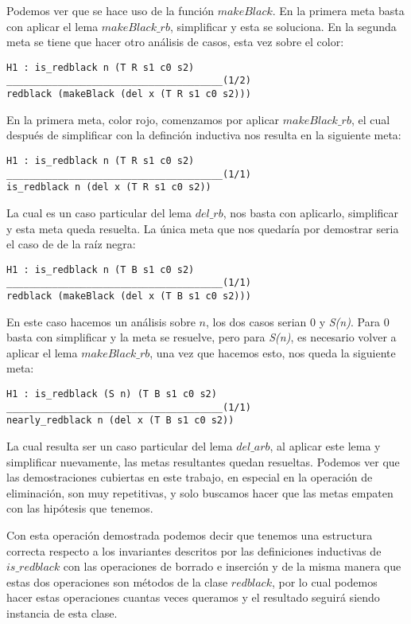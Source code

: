 Podemos ver que se hace uso de la funci\'on $makeBlack$. En la primera meta basta con aplicar el
lema $makeBlack\_rb$, simplificar y esta se soluciona. En la segunda meta se tiene que hacer otro
an\'alisis de casos, esta vez sobre el color:

\begin{verbatim}
H1 : is_redblack n (T R s1 c0 s2)
______________________________________(1/2)
redblack (makeBlack (del x (T R s1 c0 s2)))

\end{verbatim}

En la primera meta, color rojo, comenzamos por aplicar $makeBlack\_rb$, el cual despu\'es de
simplificar con la definci\'on inductiva nos resulta en la siguiente meta:

\begin{verbatim}
H1 : is_redblack n (T R s1 c0 s2)
______________________________________(1/1)
is_redblack n (del x (T R s1 c0 s2))
\end{verbatim}

La cual es un caso particular del lema $del\_rb$, nos basta con aplicarlo, simplificar y esta meta
queda resuelta. La \'unica meta que nos quedaría por demostrar seria el caso de de la raíz negra:

\begin{verbatim}
H1 : is_redblack n (T B s1 c0 s2)
______________________________________(1/1)
redblack (makeBlack (del x (T B s1 c0 s2)))
\end{verbatim}

En este caso hacemos un análisis sobre $n$, los dos casos serian 0 y \textit{S(n)}. Para 0 basta
con simplificar y la meta se resuelve, pero para \textit{S(n)}, es necesario volver a aplicar el
lema $makeBlack\_rb$, una vez que hacemos esto, nos queda la siguiente meta:

\begin{verbatim}
H1 : is_redblack (S n) (T B s1 c0 s2)
______________________________________(1/1)
nearly_redblack n (del x (T B s1 c0 s2))
\end{verbatim}

La cual resulta ser un caso particular del lema $del\_arb$, al aplicar este lema y simplificar
nuevamente, las metas resultantes quedan resueltas. Podemos ver que las demostraciones cubiertas en
este trabajo, en especial en la operaci\'on de eliminación, son muy repetitivas, y solo buscamos
hacer que las metas empaten con las hip\'otesis que tenemos.

Con esta operaci\'on demostrada podemos decir que tenemos una estructura correcta respecto
a los invariantes descritos por las definiciones inductivas de $is\_redblack$ con las
operaciones de borrado e inserción y de la misma manera que estas dos operaciones son métodos de la
clase $redblack$, por lo cual podemos hacer estas operaciones cuantas veces queramos y el resultado
seguirá siendo instancia de esta clase.
